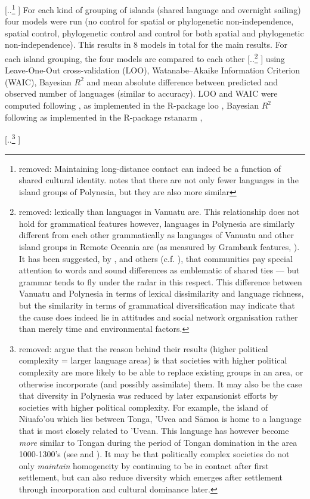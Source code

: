 \documentclass[unnumsec,webpdf,modern,medium]{oup-authoring-template}
\providecommand{\DIFaddtex}[1]{{\protect\color{blue} \sf #1}} %
\providecommand{\DIFdeltex}[1]{{\protect\color{red} [..\footnote{removed: #1} ]}} %
\providecommand{\DIFaddbegin}{} %
\providecommand{\DIFaddend}{} %
\providecommand{\DIFdelbegin}{} %
\providecommand{\DIFdelend}{} %
\providecommand{\DIFadd}[1]{\texorpdfstring{\DIFaddtex{#1}}{#1}} %
\providecommand{\DIFdel}[1]{\texorpdfstring{\DIFdeltex{#1}}{}} %
\newcommand{\DIFscaledelfig}{0.5}
\newlength{\DIFdelgraphicswidth} %
\newlength{\DIFdelgraphicsheight} %
\newcommand{\DIFaddincludegraphics}[2][]{{\color{blue}\fbox{\DIFOincludegraphics[#1]{#2}}}} %
\newcommand{\DIFdelincludegraphics}[2][]{%
\sbox{\DIFdelgraphicsbox}{\DIFOincludegraphics[#1]{#2}}%
\settoboxwidth{\DIFdelgraphicswidth}{\DIFdelgraphicsbox} %
\settoboxtotalheight{\DIFdelgraphicsheight}{\DIFdelgraphicsbox} %
\scalebox{\DIFscaledelfig}{%
\parbox[b]{\DIFdelgraphicswidth}{\usebox{\DIFdelgraphicsbox}\\[-\baselineskip] \rule{\DIFdelgraphicswidth}{0em}}\llap{\resizebox{\DIFdelgraphicswidth}{\DIFdelgraphicsheight}{%
\setlength{\unitlength}{\DIFdelgraphicswidth}%
\begin{picture}(1,1)%
\thicklines\linethickness{2pt} %
{\color[rgb]{1,0,0}\put(0,0){\framebox(1,1){}}}%
{\color[rgb]{1,0,0}\put(0,0){\line( 1,1){1}}}%
{\color[rgb]{1,0,0}\put(0,1){\line(1,-1){1}}}%
\end{picture}%
}\hspace*{3pt}}} %
} %
\DeclareRobustCommand{\DIFaddbegin}{\DIFOaddbegin \let\includegraphics\DIFaddincludegraphics} %
\DeclareRobustCommand{\DIFaddend}{\DIFOaddend \let\includegraphics\DIFOincludegraphics} %
\DeclareRobustCommand{\DIFdelbegin}{\DIFOdelbegin \let\includegraphics\DIFdelincludegraphics} %
\DeclareRobustCommand{\DIFdelend}{\DIFOaddend \let\includegraphics\DIFOincludegraphics} %
\begin{document}
\DIFdel{Maintaining long-distance contact can indeed be a function of shared cultural identity. \citet[218-291]{skirgaard2020multilevel} notes that there are not only fewer languages in the island groups of Polynesia, but they are also more similar }\DIFdelend \DIFaddbegin \DIFadd{For each kind of grouping of islands (shared language and overnight sailing) four models were run (no control for spatial or phylogenetic non-independence, spatial control, phylogenetic control and control for both spatial and phylogenetic non-independence). This results in 8 models in total for the main results. For each island grouping, the four models are compared }\DIFaddend to each other \DIFdelbegin \DIFdel{lexically than languages in Vanuatu are. This relationship does not hold for grammatical features however, languages in Polynesia are similarly different from each other grammatically as languages of Vanuatu and other island groups in Remote Oceania are (as measured by Grambank features, \citep{grambank_release}). It has been suggested, by \citet{silverstein1981limits}, \citet{francois2011} and others (c.f. \citet{mansfield2023dialect}), that communities pay special attention to words and sound differences as emblematic of shared ties --- but grammar tends to fly under the radar in this respect. This difference between Vanuatu and Polynesia in terms of lexical dissimilarity and language richness, but the similarity in terms of grammatical diversification may indicate that the cause does indeed lie in attitudes and social network organisation rather than merely time and environmental factors.
}\DIFdelend \DIFaddbegin \DIFadd{using Leave-One-Out cross-validation (LOO), Watanabe–Akaike Information Criterion (WAIC), Bayesian $R^2$ and mean absolute difference between predicted and observed number of languages (similar to accuracy). LOO and WAIC were computed following  \citet{vehtari2017practical}, as implemented in the R-package loo \citep{R-loo}, Bayesian $R^2$ following \citet{gelman2019r} as implemented in the R-package rstanarm \citep{R-rstanarm},
}\DIFaddend 

\DIFdelbegin \DIFdel{\citet{curriemace2009} argue that the reason behind their results (higher political complexity = larger language areas) is that societies with higher political complexity are more likely to be able to replace existing groups in an area, or otherwise incorporate (and possibly assimilate) them. It may also be the case that diversity in Polynesia was reduced by later expansionist efforts by societies with higher political complexity. For example, the island of Niuafo'ou which lies between Tonga, 'Uvea and S\={a}moa is home to a language that is most closely related to 'Uvean. This language has however become \emph{more} similar to Tongan during the period of Tongan domination in the area 1000-1300's (see \citet{aswani1998tongan} and \citep[2-9]{tuskamoto_niuafoou}). It may be that politically complex societies do not only \emph{maintain} homogeneity by continuing to be in contact after first settlement, but can also reduce diversity which emerges after settlement through incorporation and cultural dominance later.
}%
\end{document}
